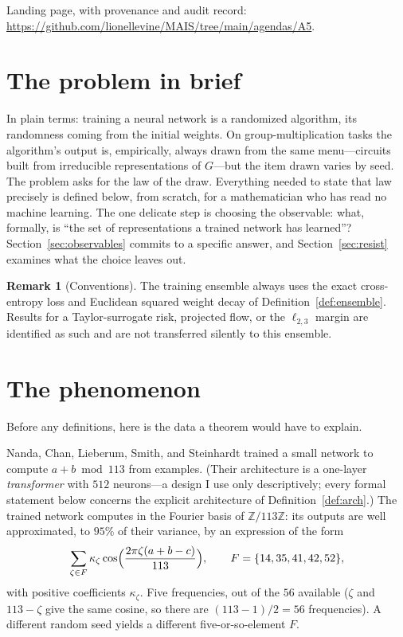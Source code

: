 \documentclass[11pt]{amsart}
\theoremstyle{plain}
\theoremstyle{definition}
\newtheorem{remark}[theorem]{Remark}
\newcommand{\Z}{\mathbb{Z}}
\begin{document}
\noindent Landing page, with provenance and audit record: \url{https://github.com/lionellevine/MAIS/tree/main/agendas/A5}.

\section{The problem in brief}



In plain terms: training a neural network is a randomized algorithm, its randomness coming from the initial weights. On group-multiplication tasks the algorithm's output is, empirically, always drawn from the same menu---circuits built from irreducible representations of $G$---but the item drawn varies by seed. The problem asks for the law of the draw. Everything needed to state that law precisely is defined below, from scratch, for a mathematician who has read no machine learning. The one delicate step is choosing the observable: what, formally, is ``the set of representations a trained network has learned''? Section~\ref{sec:observables} commits to a specific answer, and Section~\ref{sec:resist} examines what the choice leaves out.

\begin{remark}[Conventions]
The training ensemble always uses the exact cross-entropy loss and Euclidean squared weight decay of Definition~\ref{def:ensemble}. Results for a Taylor-surrogate risk, projected flow, or the $\ell_{2,3}$ margin are identified as such and are not transferred silently to this ensemble.
\end{remark}

\section{The phenomenon}\label{sec:phenomenon}

Before any definitions, here is the data a theorem would have to explain.

Nanda, Chan, Lieberum, Smith, and Steinhardt \cite{nanda2023} trained a small network to compute $a+b \bmod 113$ from examples. (Their architecture is a one-layer \emph{transformer} with $512$ neurons---a design I use only descriptively; every formal statement below concerns the explicit architecture of Definition~\ref{def:arch}.) The trained network computes in the Fourier basis of $\Z/113\Z$: its outputs are well approximated, to $95\%$ of their variance, by an expression of the form
\[
   \sum_{\zeta \in F} \kappa_\zeta \cos\Bigl(\frac{2\pi \zeta (a+b-c)}{113}\Bigr),
   \qquad F = \{14, 35, 41, 42, 52\},
\]
with positive coefficients $\kappa_\zeta$. Five frequencies, out of the $56$ available ($\zeta$ and $113 - \zeta$ give the same cosine, so there are $(113-1)/2 = 56$ frequencies). A different random seed yields a different five-or-so-element $F$.
\end{document}
